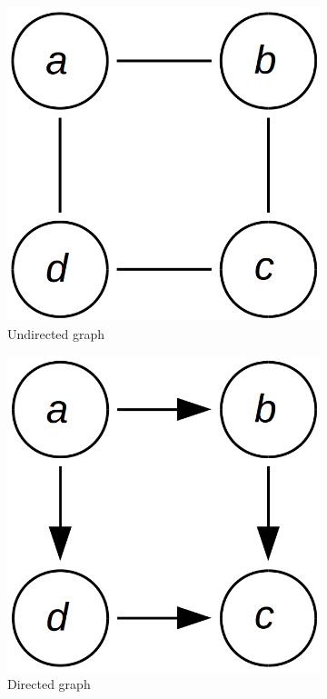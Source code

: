 \documentclass[12pt,oneside,openany,a4paper, %
afrikaans,english,
]{memoir}
\numberwithin{equation}{chapter}
\begin{document}
\begin{figure}[h!]
  \centering
  \begin{subfigure}[b]{0.25\linewidth}
    \includegraphics[width=\linewidth]{Figures/undirected_graph.png}
    \caption{Undirected graph}
  \end{subfigure}
  \begin{subfigure}[b]{0.25\linewidth}
    \includegraphics[width=\linewidth]{Figures/directed_graph.png}
    \caption{Directed graph}
  \end{subfigure}
  \caption{}
  \label{fig:comGraphs}
\end{figure}
\end{document}
